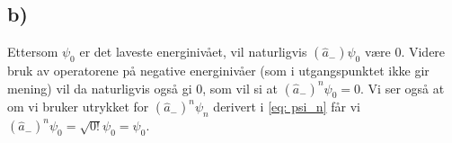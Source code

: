 \documentclass[norsk]{article}
\begin{document}
\subsection*{b)}
Ettersom $ψ_0$ er det laveste energinivået, vil naturligvis $\left(\hat{a}_{-}\right)ψ_0$ være 0. Videre bruk av operatorene på negative energinivåer (som i utgangspunktet ikke gir mening) vil da naturligvis også gi 0, som vil si at $\left(\hat{a}_{-}\right)^{n}ψ_0 = 0$. Vi ser også at om vi bruker utrykket for $\left(\hat{a}_{-}\right)^{n} ψ_n$ derivert i \cref{eq: psi_n} får vi $\left(\hat{a}_{-}\right)^{n}ψ_0 = \sqrt{0!}ψ_0 = ψ_0$. 



% 

  
  
  
  
  
  
  
\end{document}
